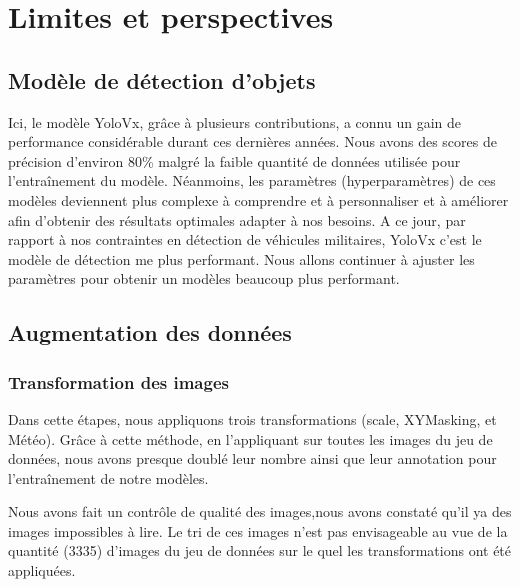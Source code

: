 \section{Limites et perspectives}
\subsection{Modèle de détection d'objets}

Ici, le modèle YoloVx, grâce à plusieurs contributions, a connu un gain de performance considérable durant ces dernières années.
Nous avons des scores de précision d'environ 80\% malgré la faible quantité de données utilisée pour l'entraînement du modèle.
Néanmoins, les paramètres (hyperparamètres) de ces modèles deviennent plus complexe à comprendre et à personnaliser et à améliorer afin d'obtenir des résultats optimales adapter à nos besoins.
A ce jour, par rapport à nos contraintes en détection de véhicules militaires, YoloVx c'est le modèle de détection me plus performant.
Nous allons continuer à ajuster les paramètres pour obtenir un modèles beaucoup plus performant.

\subsection{Augmentation des données}
\subsubsection{Transformation des images}
\label{trando_image}
Dans cette étapes, nous appliquons trois transformations (scale, XYMasking, et Météo).
Grâce à cette méthode, en l'appliquant sur toutes les images du jeu de données, nous avons presque doublé leur nombre ainsi que leur annotation pour l'entraînement de notre modèles.

Nous avons fait un contrôle de qualité des images,nous avons constaté qu'il ya des images impossibles à lire.
Le tri de ces images n'est pas envisageable au vue de la quantité (3335) d'images du jeu de données sur le quel les transformations ont été appliquées.


